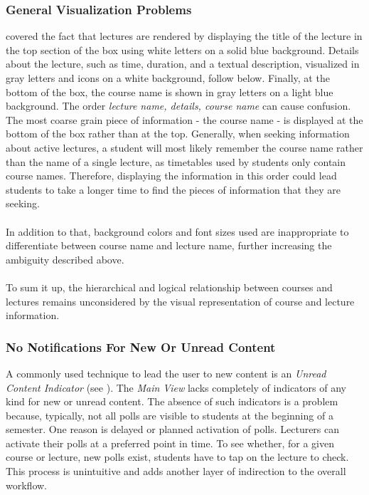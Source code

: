 \subsubsection{General Visualization Problems}
\label{section:con:problems:mainview:generalvis}  covered the fact that lectures are rendered by displaying the title of the lecture in the top section of the box using white letters on a solid blue background. Details about the lecture, such as time, duration, and a textual description, visualized in gray letters and icons on a white background, follow below. Finally, at the bottom of the box, the course name is shown in gray letters on a light blue background. The order \emph{lecture name, details, course name} can cause confusion.
The most coarse grain piece of information - the course name - is displayed at the bottom of the box rather than at the top. Generally, when seeking information about active lectures, a student will most likely remember the course name rather than the name of a single lecture, as timetables used by students only contain course names. Therefore, displaying the information in this order could lead students to take a longer time to find the pieces of information that they are seeking.
\\
\\
In addition to that, background colors and font sizes used are inappropriate to differentiate between course name and lecture name, further increasing the ambiguity described above.
\\
\\
To sum it up, the hierarchical and logical relationship between courses and lectures remains unconsidered by the visual representation of course and lecture information.

\subsubsection{No Notifications For New Or Unread Content}
\label{section:con:problems:noindicators}
A commonly used technique to lead the user to new content is an \emph{Unread Content Indicator} (see ).
The \emph{Main View} lacks completely of indicators of any kind for new or unread content. The absence of such indicators is a problem because, typically, not all polls are visible to students at the beginning of a semester. One reason is delayed or planned activation of polls. Lecturers can activate their polls at a preferred point in time. To see whether, for a given course or lecture, new polls exist, students have to tap on the lecture to check. This process is unintuitive and adds another layer of indirection to the overall workflow.

